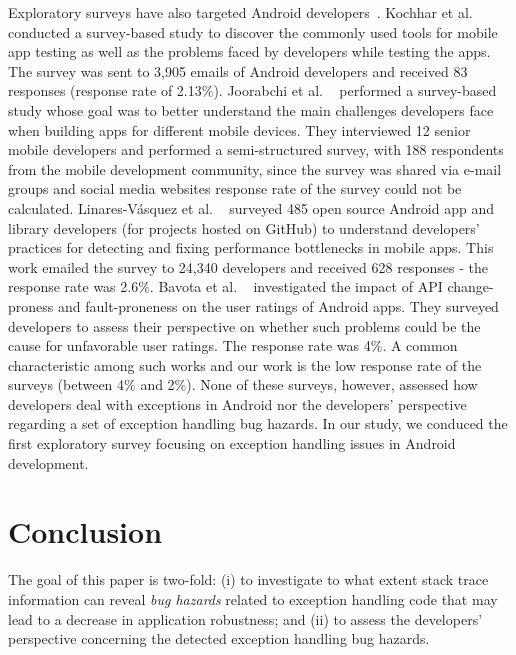 {Exploratory surveys have also targeted Android developers~\cite{kochhar2015understanding,joorabchi2013real,bavota2015impact,linares2015developers}.
Kochhar et al. ~\cite{kochhar2015understanding} conducted a survey-based study to discover the
commonly used tools for mobile app testing as well as the problems
faced by developers while testing the apps. The survey was sent to 3,905 emails of Android developers
and received 83 responses (response rate of 2.13\%).
Joorabchi et al. ~\cite{joorabchi2013real} performed a survey-based study whose goal was to better understand the main challenges
developers face when building apps for different mobile devices.
They interviewed 12 senior mobile developers and performed a semi-structured survey, with 188 respondents
 from the mobile development community, since the survey was shared via e-mail groups and social media websites
response rate of the survey could not be calculated. Linares-V\'{a}squez et al. ~\cite{linares2015developers} surveyed 485 open source Android
app and library developers (for projects hosted on GitHub)  to understand developers' practices for detecting and fixing
performance bottlenecks in mobile apps.  This work emailed the survey to 24,340 developers and received
628 responses - the response rate was 2.6\%.
Bavota et al. ~\cite{bavota2015impact} investigated the impact of API change-proness and fault-proneness on the user ratings of Android apps.
They surveyed developers to assess their perspective on whether such problems could be the cause for unfavorable user ratings.
The response rate was 4\%.
A common characteristic among such works and our work is the low response rate of the surveys (between 4\% and 2\%).
None of these surveys, however, assessed how developers deal with exceptions in Android nor
the developers' perspective regarding a set of exception handling bug hazards.
In our study,
we conduced the first exploratory survey focusing on exception handling issues in Android development.


\section{Conclusion}
\label{sec:conc}

The goal of this paper is two-fold: (i) to investigate
to what extent stack trace information can reveal \emph{bug hazards}
related to exception handling code that may lead to a decrease in
application robustness; and (ii) to assess the developers' perspective
concerning the detected exception handling bug hazards.

}
